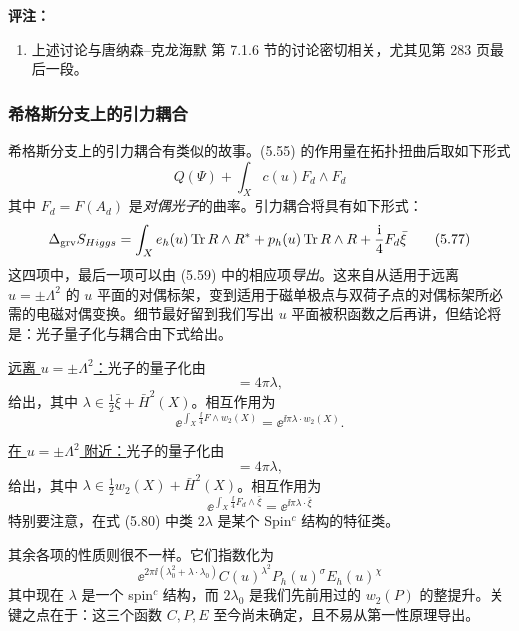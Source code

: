 \medskip
\noindent\textbf{评注：}
\begin{enumerate}[label=\arabic*., leftmargin=2.1em]
\item 上述讨论与唐纳森--克龙海默 \cite{ref8} 第 7.1.6 节的讨论密切相关，尤其见第 283 页最后一段。
\end{enumerate}

\subsubsection{希格斯分支上的引力耦合}

希格斯分支上的引力耦合有类似的故事。(5.55) 的作用量在拓扑扭曲后取如下形式
\begin{equation}
Q(\Psi)+\int_{X}c(u)F_{d}\wedge F_{d}
\tag{5.76}
\end{equation}
其中 $F_{d}=F(A_{d})$ 是\emph{对偶光子}的曲率。引力耦合将具有如下形式：
\begin{equation}
\Delta_{\text{grv}}S_{Higgs}=\int_{X}e_{h}(u)\operatorname{Tr} R\wedge R^{*}
+p_{h}(u)\operatorname{Tr} R\wedge R+\frac{\mathrm{i}}{4}F_{d}\bar\xi
\tag{5.77}
\end{equation}
这四项中，最后一项可以由 (5.59) 中的相应项\emph{导出}。这来自从适用于远离 $u=\pm\Lambda^{2}$ 的 $u$ 平面的对偶标架，变到适用于磁单极点与双荷子点的对偶标架所必需的电磁对偶变换。细节最好留到我们写出 $u$ 平面被积函数之后再讲，但结论将是：光子量子化与耦合由下式给出。

\noindent\underline{远离 $u=\pm\Lambda^{2}$：}光子的量子化由
\begin{equation}
  [F]=4\pi\lambda ,
  \tag{5.78}
\end{equation}
给出，其中 $\lambda\in\tfrac{1}{2}\bar\xi+\bar H^{2}(X)$。相互作用为
\begin{equation}
\ee^{\int_{X}\frac{\ii}{4}F\wedge w_{2}(X)}=\ee^{\ii\pi\lambda\cdot w_{2}(X)}.
\tag{5.79}
\end{equation}

\noindent\underline{在 $u=\pm\Lambda^{2}$ 附近：}光子的量子化由
\begin{equation}
  [F_{d}]=4\pi\lambda ,
  \tag{5.80}
\end{equation}
给出，其中 $\lambda\in\tfrac{1}{2}w_{2}(X)+\bar H^{2}(X)$。相互作用为
\begin{equation}
\ee^{\int_{X}\frac{\ii}{4}F_{d}\wedge\bar\xi}=\ee^{\ii\pi\lambda\cdot\bar\xi}
\tag{5.81}
\end{equation}
特别要注意，在式 (5.80) 中类 $2\lambda$ 是某个 Spin$^{c}$ 结构的特征类。

其余各项的性质则很不一样。它们指数化为
\begin{equation}
\ee^{2\pi\ii\left(\lambda_{0}^{2}+\lambda\cdot\lambda_{0}\right)}
C(u)^{\lambda^{2}}P_{h}(u)^{\sigma}E_{h}(u)^{\chi}
\tag{5.82}
\end{equation}
其中现在 $\lambda$ 是一个 spin$^{c}$ 结构，而 $2\lambda_{0}$ 是我们先前用过的 $w_{2}(P)$ 的整提升。关键之点在于：这三个函数 $C,P,E$ 至今尚未确定，且不易从第一性原理导出。

